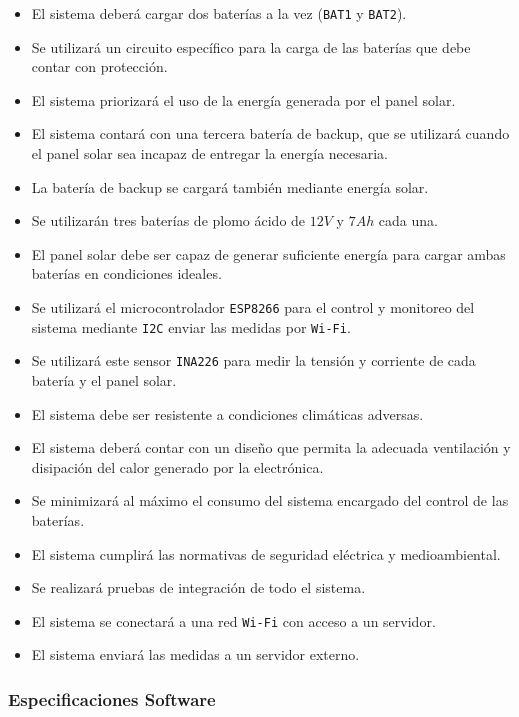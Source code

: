 \begin{itemize}
    \item El sistema deberá cargar dos baterías a la vez (\texttt{BAT1} y \texttt{BAT2}).
    \item Se utilizará un circuito específico para la carga de las baterías que debe contar con protección.
    \item El sistema priorizará el uso de la energía generada por el panel solar.
    \item El sistema contará con una tercera batería de backup, que se utilizará cuando el panel solar sea incapaz de entregar la energía necesaria.
    \item La batería de backup se cargará también mediante energía solar.
    \item Se utilizarán tres baterías de plomo ácido de $12 V$ y $7 Ah$ cada una. 
    \item El panel solar debe ser capaz de generar suficiente energía para cargar ambas baterías en condiciones ideales.
    \item Se utilizará el microcontrolador \texttt{ESP8266} para el control y monitoreo del sistema mediante \texttt{I2C} enviar las medidas por \texttt{Wi-Fi}.
    \item Se utilizará este sensor \texttt{INA226} para medir la tensión y corriente de cada batería y el panel solar.
    \item El sistema debe ser resistente a condiciones climáticas adversas. 
    \item El sistema deberá contar con un diseño que permita la adecuada ventilación y disipación del calor generado por la electrónica.
    \item Se minimizará al máximo el consumo del sistema encargado del control de las baterías.
    \item El sistema cumplirá las normativas de seguridad eléctrica y medioambiental.
    \item Se realizará pruebas de integración de todo el sistema.
    \item El sistema se conectará a una red \texttt{Wi-Fi} con acceso a un servidor.
    \item El sistema enviará las medidas a un servidor externo.
\end{itemize}

\subsubsection{Especificaciones Software}

